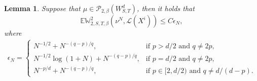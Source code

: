\documentclass[12pt]{article}
\newtheorem{lemma}[theorem]{Lemma}
\def\L{\mathscr{L}}
\def\N{\mathbb N}
\def\E{\mathbb E}
\def\W{\mathbb{W}}
\numberwithin{equation}{section}
\begin{document}
		\begin{lemma}\label{lem3.3}
		Suppose that $\mu \in \mathscr P_{2,\beta}(W^d_{S,T})$, then it holds that
		\begin{equation}
			\E\W^2_{2,S,T,\beta}(\nu^N,\L(X^i))\leq C\epsilon_N,
		\end{equation}
			where
		\begin{align*}
			\epsilon_N=\left\{\begin{array}{ll}N^{-1/2}+N^{-(q-p)/q},&\text{if }p>d/2\text{ and }q\neq2p,\\N^{-1/2}\log(1+N)+N^{-(q-p)/q},&\text{if }p=d/2\text{ and }q\neq2p,\\N^{-p/d}+N^{-(q-p)/q},&\text{if }p\in[2,d/2)\text{ and }q\neq d/(d-p).\end{array}\right.
		\end{align*}
		\end{lemma}
\end{document}
